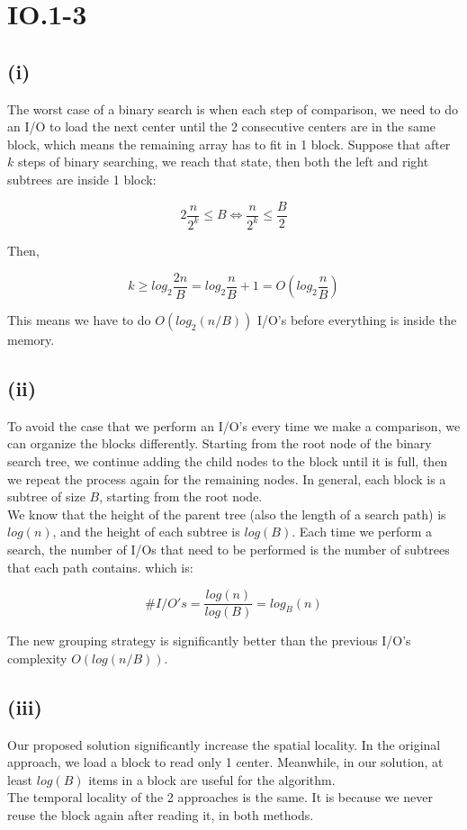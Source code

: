 \section*{IO.1-3}
\subsection*{(i)}
The worst case of a binary search is when each step of comparison, we need to do an I/O to load the next center until the 2 consecutive centers are in the same block, which means the remaining array has to fit in 1 block. Suppose that after $k$ steps of binary searching, we reach that state, then both the left and right subtrees are inside 1 block:

$$2 \frac{n}{2^k} \leq B \iff \frac{n}{2^k} \leq \frac{B}{2}$$

Then,

$$k \geq log_2 \frac{2n}{B} = log_2 \frac{n}{B} + 1 = O(log_2 \frac{n}{B}) $$

This means we have to do $O(log_2(n / B))$ I/O's before everything is inside the memory.

\subsection*{(ii)}
To avoid the case that we perform an I/O's every time we make a comparison, we can organize the blocks differently. Starting from the root node of the binary search tree, we continue adding the child nodes to the block until it is full, then we repeat the process again for the remaining nodes. In general, each block is a subtree of size $B$, starting from the root node.\\

We know that the height of the parent tree (also the length of a search path) is $log(n)$, and the height of each subtree is $log(B)$. Each time we perform a search, the number of I/Os that need to be performed is the number of subtrees that each path contains. which is:

$$\#I/O's = \frac{log(n)}{log(B)} = log_B (n)$$

The new grouping strategy is significantly better than the previous I/O's complexity $O(log(n/B))$.

\subsection*{(iii)}
Our proposed solution significantly increase the spatial locality. In the original approach, we load a block to read only 1 center. Meanwhile, in our solution, at least $log(B)$ items in a block are useful for the algorithm.\\

The temporal locality of the 2 approaches is the same. It is because we never reuse the block again after reading it, in both methods.
